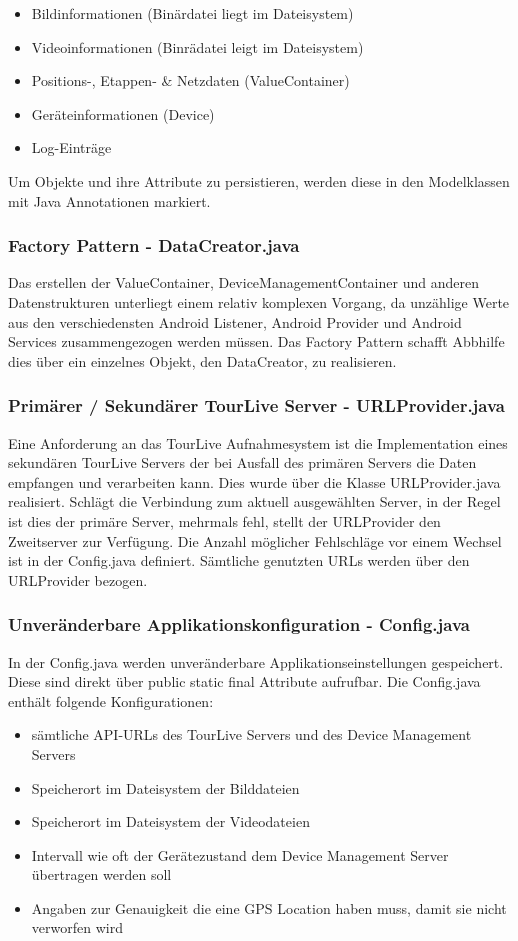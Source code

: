 \begin{itemize} [noitemsep,topsep=0pt]
	\item Bildinformationen (Binärdatei liegt im Dateisystem)
	\item Videoinformationen (Binrädatei leigt im Dateisystem)
	\item Positions-, Etappen- \& Netzdaten (ValueContainer)
	\item Geräteinformationen (Device)
	\item Log-Einträge
\end{itemize}

Um Objekte und ihre Attribute zu persistieren, werden diese in den Modelklassen mit Java Annotationen markiert. 

\subsubsection{Factory Pattern - DataCreator.java}
Das erstellen der ValueContainer, DeviceManagementContainer und anderen Datenstrukturen unterliegt einem relativ komplexen Vorgang, da unzählige Werte aus den verschiedensten Android Listener,  Android Provider und Android Services zusammengezogen werden müssen. Das Factory Pattern schafft Abbhilfe dies über ein einzelnes Objekt, den DataCreator, zu realisieren.

\subsubsection{Primärer / Sekundärer TourLive Server - URLProvider.java}
Eine Anforderung an das TourLive Aufnahmesystem ist die Implementation eines sekundären TourLive Servers der bei Ausfall des primären Servers die Daten empfangen und verarbeiten kann. Dies wurde über die Klasse URLProvider.java realisiert. Schlägt die Verbindung zum aktuell ausgewählten Server, in der Regel ist dies der primäre Server, mehrmals fehl, stellt der URLProvider den Zweitserver zur Verfügung. Die Anzahl möglicher Fehlschläge vor einem Wechsel ist in der Config.java definiert. Sämtliche genutzten URLs werden über den URLProvider bezogen.

\subsubsection{Unveränderbare Applikationskonfiguration - Config.java}
In der Config.java werden unveränderbare Applikationseinstellungen gespeichert. Diese sind direkt über public static final Attribute aufrufbar. Die Config.java enthält folgende Konfigurationen:
\begin{itemize} [noitemsep,topsep=0pt]
	\item sämtliche API-URLs des TourLive Servers und des Device Management Servers
	\item Speicherort im Dateisystem der Bilddateien
	\item Speicherort im Dateisystem der Videodateien
	\item Intervall wie oft der Gerätezustand dem Device Management Server übertragen werden soll
	\item Angaben zur Genauigkeit die eine GPS Location haben muss, damit sie nicht verworfen wird
\end{itemize}

